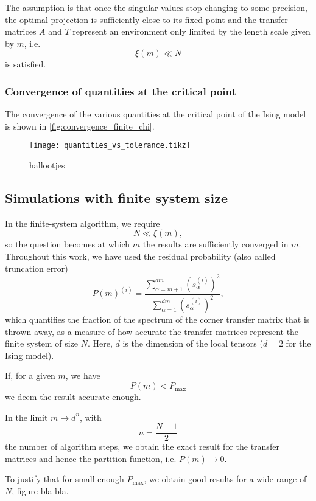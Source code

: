 The assumption is that once the singular values stop changing to some precision, the optimal projection is sufficiently
close to its fixed point and the transfer matrices $A$ and $T$ represent an environment only limited by the length scale
given by $m$, i.e.
\begin{equation}
  \xi(m) \ll N
\end{equation}
is satisfied.

\subsubsection{Convergence of quantities at the critical point}
The convergence of the various quantities at the critical point of the Ising model is shown in
\autoref{fig:convergence_finite_chi}.


\begin{figure}
  \texttt{[image: quantities\_vs\_tolerance.tikz]}
  \caption{hallootjes}\label{fig:quantities_vs_tolerance}
\end{figure}




\subsection{Simulations with finite system size}
In the finite-system algorithm, we require
\begin{equation}
  N \ll \xi(m),
\end{equation}
so the question becomes at which $m$ the results are sufficiently converged in $m$. Throughout this work, we have used
the residual probability (also called truncation error)
\begin{equation}
  P(m)^{(i)} = \frac{\sum_{\alpha = m + 1}^{dm} (s_{\alpha}^{(i)})^2 }{ \sum_{\alpha = 1}^{dm} (s_{\alpha}^{(i)})^2 },
\end{equation}
which quantifies the fraction of the spectrum of the corner transfer matrix that is thrown away, as a measure of how
accurate the transfer matrices represent the finite system of size $N$. Here, $d$ is the
dimension of the local tensors ($d = 2$ for the Ising model).

If, for a given $m$, we have
\begin{equation}
  P(m) < P_{\text{max}}
\end{equation}
we deem the result accurate enough.

In the limit $m \to d^n$, with
\begin{equation}
  n = \frac{N - 1}{2}
\end{equation}
the number of algorithm steps, we obtain the exact result for the transfer matrices and hence the partition function,
i.e. $P(m) \to 0$.

To justify that for small enough $P_{\max}$, we obtain good results for a wide range of $N$, figure bla bla.
